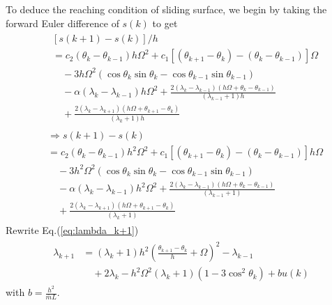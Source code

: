 \documentclass[10pt,onecolumn,draftcls]{IEEEtran}
\begin{document}
	To deduce the reaching condition of sliding surface, we begin by taking the forward Euler difference of $s(k)$ to get
	\begin{align*}\begin{split}
                &[s(k+1)-s(k)]/h\\
                &=c_2(\theta_k-\theta_{k-1})h\Omega^2+c_1[(\theta_{k+1}-\theta_k)-(\theta_{k}-\theta_{k-1})]\Omega\\
                &\quad-3h\Omega^2(\cos\theta_k\sin\theta_k-\cos\theta_{k-1}\sin\theta_{k-1})\\
				&\quad-\alpha(\lambda_k-\lambda_{k-1})h\Omega^2+\frac{2(\lambda_k-\lambda_{k-1})(h\Omega+\theta_k-\theta_{k-1})}{(\lambda_{k-1}+1)h}\\
				&\quad+\frac{2(\lambda_k-\lambda_{k+1})(h\Omega+\theta_{k+1}-\theta_{k})}{(\lambda_{k}+1)h}
        \end{split}\end{align*}
        \begin{align*}\begin{split}
                &\Rightarrow s(k+1)-s(k)\\
                &=c_2(\theta_k-\theta_{k-1})h^2\Omega^2+c_1[(\theta_{k+1}-\theta_k)-(\theta_{k}-\theta_{k-1})]h\Omega\\
				&\quad-3h^2\Omega^2(\cos\theta_k\sin\theta_k-\cos\theta_{k-1}\sin\theta_{k-1})\\
				&\quad-\alpha(\lambda_k-\lambda_{k-1})h^2\Omega^2+\frac{2(\lambda_k-\lambda_{k-1})(h\Omega+\theta_k-\theta_{k-1})}{(\lambda_{k-1}+1)}\\
                &\quad+\frac{2(\lambda_k-\lambda_{k+1})(h\Omega+\theta_{k+1}-\theta_{k})}{(\lambda_{k}+1)}
	\end{split}\end{align*} 
	Rewrite Eq.(\ref{eq:lambda_k+1})
	\begin{align}\begin{split}
                \lambda_{k+1}&=(\lambda_k+1)h^2\left(\frac{\theta_{k+1}-\theta_{k}}{h}+\Omega\right)^2
                -\lambda_{k-1}\\
                &\quad+2\lambda_k-h^2\Omega^2(\lambda_k+1)(1-3\cos^2\theta_{k})+bu(k)
	\end{split}\end{align}
	with $b = \frac{h^2}{\bar{m}L}$.
	
\end{document}
